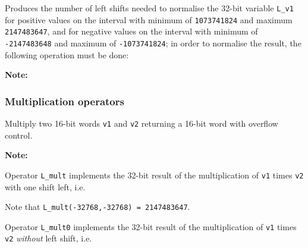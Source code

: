 
Produces the number of left shifts needed to normalise the 32-bit
variable {\tt L\_v1} for positive values on the interval with
minimum of {\tt 1073741824} and maximum {\tt 2147483647}, and for
negative values on the interval with minimum of {\tt -2147483648}
and maximum of {\tt -1073741824}; in order to normalise the
result, the following operation must be done:


\textbf{Note:} \hfill {}

\subsubsection{Multiplication operators}


Multiply two 16-bit words {\tt v1} and {\tt v2} returning a 16-bit word with overflow control.

\textbf{Note:} \hfill {}


Operator {\tt L\_mult} implements the 32-bit result of the
multiplication of {\tt v1} times {\tt v2} with one shift left,
i.e.


Note that {\tt L\_mult(-32768,-32768) = 2147483647}.


Operator {\tt L\_mult0} implements the 32-bit result of the
multiplication of {\tt v1} times {\tt v2} {\em without} left
shift, i.e.



